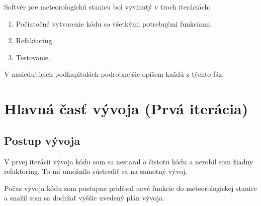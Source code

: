 Softvér pre meteorologickú stanicu bol vyvinutý v troch iteráciách:
\begin{enumerate}
    \item Počiatočné vytvorenie kódu so všetkými potrebnými funkciami.
    \item Refaktoring.
    \item Testovanie.
\end{enumerate}
V nasledujúcich podkapitolách podrobnejšie opíšem každú z týchto fáz.

\section{Hlavná časť vývoja (Prvá iterácia)}
\subsection{Postup vývoja}
V prvej iterácii vývoja kódu som sa nestaral o čistotu kódu a nerobil som žiadny refaktoring. To mi umožnilo sústrediť sa na samotný vývoj. 

Počas vývoja kódu som postupne pridával nové funkcie do meteorologickej stanice a snažil som sa dodržať vyššie uvedený plán vývoja. 

